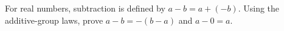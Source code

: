 For real numbers, subtraction is defined by $a-b=a+(-b)$. Using the additive-group laws, prove $a-b=-(b-a)$ and $a-0=a$.
